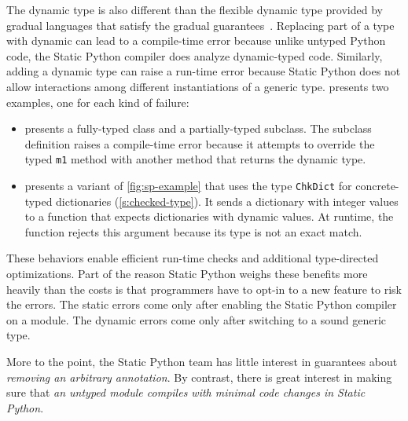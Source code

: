 \documentclass[english,cleveref,submission]{programming}
\newcommand{\SP}{Static Python}
\newcommand{\code}[1]{\texttt{#1}}
\begin{document}
The dynamic type is also different than the flexible dynamic type provided
by gradual languages that satisfy the gradual guarantees~\cite{svcb-snapl-2015}.
Replacing part of a type with dynamic can lead to a compile-time error because
unlike untyped Python code, the \SP{} compiler does analyze dynamic-typed code.
Similarly, adding a dynamic type can raise a run-time error because
\SP{} does not allow interactions among different instantiations of a generic type.
 presents two examples, one for each kind of failure:
\begin{itemize}
  \item
     presents a fully-typed class and a partially-typed subclass.
    The subclass definition raises a compile-time error because it attempts to override
    the typed \code{m1} method with another method that returns the dynamic type.

  \item
     presents a variant of \cref{fig:sp-example} that
    uses the type \code{ChkDict} for concrete-typed dictionaries (\cref{s:checked-type}).
    It sends a dictionary with integer values to a function that expects
    dictionaries with dynamic values.
    At runtime, the function rejects this argument because its type is not an
    exact match.
\end{itemize}
These behaviors enable efficient run-time checks and additional type-directed
optimizations.
Part of the reason \SP{} weighs these benefits more heavily than the costs
is that programmers have to opt-in to a new feature to risk the errors.
The static errors come only after enabling the \SP{} compiler on a module.
The dynamic errors come only after switching to a sound generic type.

More to the point, the \SP{} team has little interest in guarantees about
\emph{removing an arbitrary annotation}.
By contrast, there is great interest in making sure that \emph{an untyped
module compiles with minimal code changes in \SP{}}.
\end{document}
